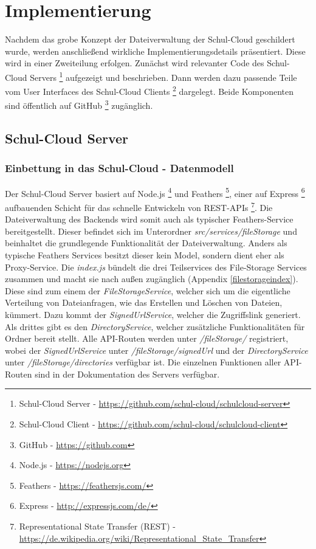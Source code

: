 \section{Implementierung}
\label{sec:implementation}

Nachdem das grobe Konzept der Dateiverwaltung der Schul-Cloud geschildert wurde, werden anschließend wirkliche Implementierungsdetails präsentiert. Diese wird in einer Zweiteilung erfolgen. Zunächst wird relevanter Code des Schul-Cloud Servers \footnote{Schul-Cloud Server - \url{https://github.com/schul-cloud/schulcloud-server}} aufgezeigt und beschrieben. Dann werden dazu passende Teile vom User Interfaces des Schul-Cloud Clients \footnote{Schul-Cloud Client - \url{https://github.com/schul-cloud/schulcloud-client}} dargelegt. Beide Komponenten sind öffentlich auf GitHub \footnote{GitHub - \url{https://github.com}} zugänglich.

\subsection{Schul-Cloud Server}
\subsubsection{Einbettung in das Schul-Cloud - Datenmodell}

Der Schul-Cloud Server basiert auf Node.js \footnote{Node.js - \url{https://nodejs.org}} und Feathers \footnote{Feathers - \url{https://feathersjs.com/}}, einer auf Express \footnote{Express - \url{http://expressjs.com/de/}} aufbauenden Schicht für das schnelle Entwickeln von REST-APIs \footnote{Representational State Transfer (REST) - \url{https://de.wikipedia.org/wiki/Representational_State_Transfer}}. Die Dateiverwaltung des Backends wird somit auch als typischer Feathers-Service bereitgestellt. Dieser befindet sich im Unterordner \textit{src/services/fileStorage} und beinhaltet die grundlegende Funktionalität der Dateiverwaltung. Anders als typische Feathers Services besitzt dieser kein Model, sondern dient eher als Proxy-Service. Die \textit{index.js} bündelt die drei Teilservices des File-Storage Services zusammen und macht sie nach außen zugänglich (Appendix \ref{filestorageindex}). Diese sind zum einem der \textit{FileStorageService}, welcher sich um die eigentliche Verteilung von Dateianfragen, wie das Erstellen und Löschen von Dateien, kümmert. Dazu kommt der \textit{SignedUrlService}, welcher die Zugriffslink generiert. Als drittes gibt es den \textit{DirectoryService}, welcher zusätzliche Funktionalitäten für Ordner bereit stellt. Alle API-Routen werden unter \textit{/fileStorage/} registriert, wobei der \textit{SignedUrlService} unter \textit{/fileStorage/signedUrl} und der \textit{DirectoryService} unter \textit{/fileStorage/directories} verfügbar ist. Die einzelnen Funktionen aller API-Routen sind in der Dokumentation des Servers \cite{online:serverswagger} verfügbar. \\

